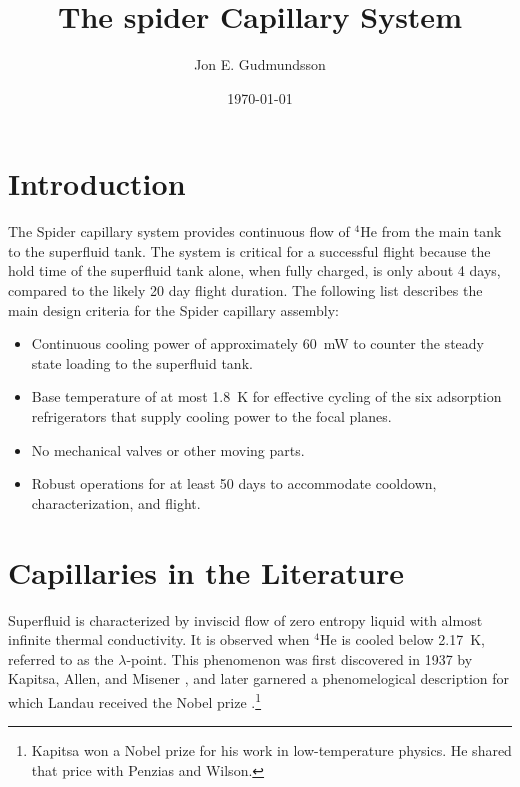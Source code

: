 \documentclass[
12pt, %
letterpaper, %
oneside, %
headinclude, footinclude, %
BCOR5mm, %
]{scrartcl}
\title{The {\sc spider} Capillary System}
\author{Jon E. Gudmundsson}
\date{\today} %
\newcommand{\he}{$^4\mathrm{He}$ }
\newcommand{\spider}{{\sc Spider} }
\begin{document}


\maketitle %

\setcounter{tocdepth}{2} %


\section{Introduction}

The \spider capillary system provides continuous flow of \he from the main tank to the superfluid tank. The system is critical for a successful flight because the hold time of the superfluid tank alone, when fully charged, is only about 4 days, compared to the likely 20 day flight duration. The following list describes the main design criteria for the \spider capillary assembly:

\begin{itemize}
\item Continuous cooling power of approximately 60~mW to counter the steady state loading to the superfluid tank.
\item Base temperature of at most 1.8~K for effective cycling of the six adsorption refrigerators that supply cooling power to the focal planes.
\item No mechanical valves or other moving parts.
\item Robust operations for at least 50 days to accommodate cooldown, characterization, and flight. 
\end{itemize}

\section{Capillaries in the Literature}
\label{sec:lit}

Superfluid is characterized by inviscid flow of zero entropy liquid with almost infinite thermal conductivity. It is observed when \he is cooled below 2.17~K, referred to as the $\lambda$-point. This phenomenon was first discovered in 1937 by Kapitsa, Allen, and Misener \cite{Allen1938}, and later garnered a phenomelogical description for which Landau received the Nobel prize \cite{Landau1941}.\footnote{Kapitsa won a Nobel prize for his work in low-temperature physics. He shared that price with Penzias and Wilson.} %
\end{document}
